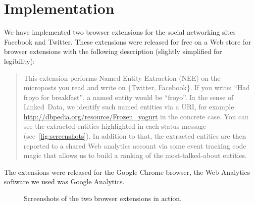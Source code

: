 \documentclass{iosart2c}
\begin{document}
\section{Implementation} \label{sec:implementation}
We have implemented two browser extensions for the social networking sites Facebook and Twitter. These extensions were released for free on a Web store for browser extensions with the following description (slightly simplified for legibility):
\begin{quotation}
This extension performs Named Entity Extraction (NEE) on the microposts you read and write on \{Twitter, Facebook\}.
If you write: ``Had froyo for breakfast'', a named entity would be ``froyo''.
In the sense of Linked~Data, we identify such named entities via a URI, for example \url{http://dbpedia.org/resource/Frozen_yogurt} in the concrete case.
You can see the extracted entities highlighted in each status message (see~\autoref{fig:screenshots}).
In addition to that, the extracted entities are then reported to a shared Web analytics account via some event tracking code magic that allows us to build a ranking of the most-talked-about entities.
\end{quotation}
The extensions were released for the Google Chrome browser, the Web Analytics software we used was Google Analytics.

\begin{figure}
  \centering
    \qquad
\caption{Screenshots of the two browser extensions in action.}
\label{fig:screenshots}
\end{figure}
\end{document}
